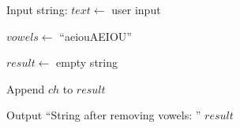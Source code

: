 \begin{algorithm}
\caption{Remove Vowels from a String}
\begin{algorithmic}[1]

\STATE Input string:
\STATE $text \gets$ user input

\STATE $vowels \gets$ ``aeiouAEIOU''

\STATE $result \gets$ empty string

        \STATE Append $ch$ to $result$
    \ENDIF
\ENDFOR

\STATE Output ``String after removing vowels: '' $result$

\end{algorithmic}
\end{algorithm}
